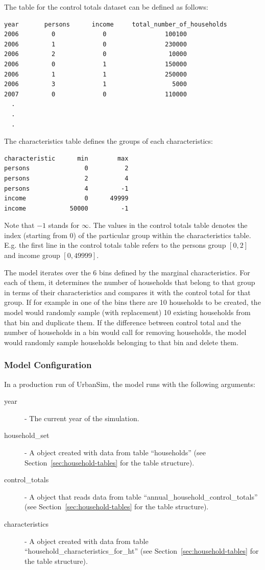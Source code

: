 The table for the control totals dataset can be
defined as follows:
\begin{verbatim}
year       persons      income     total_number_of_households
2006         0             0                100100
2006         1             0                230000
2006         2             0                 10000
2006         0             1                150000
2006         1             1                250000
2006         3             1                  5000
2007         0             0                110000
  .
  .
  .
\end{verbatim}
The characteristics table defines the groups of each characteristics:
\begin{verbatim}
characteristic      min        max
persons               0          2
persons               2          4
persons               4         -1
income                0      49999
income            50000         -1
\end{verbatim}
Note that $-1$ stands for $\infty$. The values in the control totals table
denotes the index (starting from 0) of the particular group within the
characteristics table. E.g. the first line in the control totals table refers
to the persons group $[0,2]$ and income group $[0,49999]$.

The model \modelsindex iterates over the 6 bins defined by the marginal characteristics. 
For each of them, it determines the number of households
that belong to that group in terms of their characteristics and compares it
with the control total for that group. If for example in one of the bins 
there are 10 households to be created, the model \modelsindex would randomly
sample (with replacement) 10 existing households from that bin and duplicate them.  
If the difference between control total
and the number of households in a bin would call for removing households, the
model \modelsindex would randomly sample households belonging to that bin and delete them.

\subsubsection{Model Configuration}
\modelsindex
%
In a production run of UrbanSim, the model \modelsindex runs with the following arguments:
\begin{description}
\item[year] - The current year of the simulation.
\item[household_set] - A  object created with data from
  table ``households'' (see Section~\ref{sec:household-tables}
  for the table structure).
\item[control_totals] - A  object  that reads data from table
  ``annual_household_control_totals'' (see Section~\ref{sec:household-tables}
  for the table structure).
\item[characteristics] - A  object created
  with data from table ``household_characteristics_for_ht'' (see
  Section~\ref{sec:household-tables} for the table structure).
\end{description}


